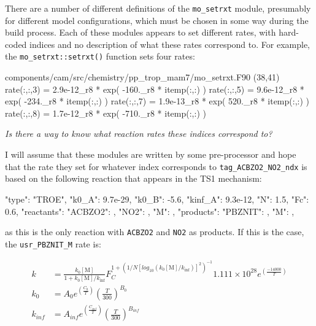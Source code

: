 \documentclass[titlepage]{article}
\begin{document}
There are a number of different definitions of the \verb>mo_setrxt> module, presumably for different model configurations, which must be chosen in some way during the build process. Each of these modules appears to set different rates, with hard-coded indices and no description of what these rates correspond to. For example, the \verb>mo_setrxt::setrxt()> function sets four rates:

\begin{blockcode}[commandchars=\\\{\}]
\color{gray}components/cam/src/chemistry/pp_trop_mam7/mo_setrxt.F90 (38,41)
      rate(:,:,3) = 2.9e-12_r8 * exp( -160._r8 * itemp(:,:) )
      rate(:,:,5) = 9.6e-12_r8 * exp( -234._r8 * itemp(:,:) )
      rate(:,:,7) = 1.9e-13_r8 * exp( 520._r8 * itemp(:,:) )
      rate(:,:,8) = 1.7e-12_r8 * exp( -710._r8 * itemp(:,:) )
\end{blockcode}

\vspace{30px}
\noindent\textit{\Large Is there a way to know what reaction rates these indices correspond to?}
\vspace{30px}

I will assume that these modules are written by some pre-processor and hope that the rate they set for whatever index corresponds to \verb>tag_ACBZO2_NO2_ndx> is based on the following reaction that appears in the TS1 mechanism:

\begin{blockcode}
        {
          "type": "TROE",
          "k0_A": 9.7e-29,
          "k0_B": -5.6,
          "kinf_A": 9.3e-12,
          "N": 1.5,
          "Fc": 0.6,
          "reactants": {
            "ACBZO2": { },
            "NO2": { },
            "M": { }
          },
          "products": {
            "PBZNIT": { },
            "M": { }
          }
        },
\end{blockcode}

\noindent as this is the only reaction with \verb>ACBZO2> and \verb>NO2> as products. If this is the case, the \verb>usr_PBZNIT_M> rate is:

\begin{equation}
\begin{split}
k & = \frac{k_0[\mbox{M}]}{1+k_0[\mbox{M}]/k_{\inf}}F_C^{1+(1/N[log_{10}(k_0[\mbox{M}]/k_{\inf})]^2)^{-1}} 1.111 \times 10^{28} e^{\left(\frac{-14000}{T}\right)}\\
k_0 & = A_0 e^{\left( \frac{C_0}{T} \right)} \left( \frac{T}{300} \right)^{B_0} \\
k_{inf} & = A_{inf} e^{\left( \frac{C_{inf}}{T} \right)} \left( \frac{T}{300} \right)^{B_{inf}}
\end{split}
\end{equation}
\end{document}
